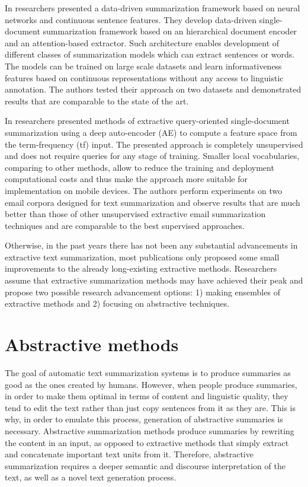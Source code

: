 \documentclass[11pt,a4paper,onecolumn]{article}
\begin{document}
In \cite{cheng2016neural} researchers presented a data-driven summarization framework based on neural networks and continuous sentence features.
They develop data-driven single-document summarization framework based on an hierarchical document encoder and an attention-based extractor.
Such architecture enables development of different classes of summarization models which can extract sentences or words.
The models can be trained on large scale datasets and learn informativeness features based on continuous representations without any access to linguistic annotation.
The authors tested their approach on two datasets and demonstrated results that are
comparable to the state of the art.

In \cite{yousefi2017text} researchers presented methods of extractive query-oriented single-document summarization using a deep auto-encoder (AE) to compute a feature space from the term-frequency (tf) input.
The presented approach is completely unsupervised and does not require queries for any stage of training.
Smaller local vocabularies, comparing to other methods, allow to reduce the training and deployment computational costs and thus make the approach more suitable for implementation on mobile devices.
The authors perform experiments on two email corpora designed for text summarization and observe results that are much better than those of other unsupervised extractive email summarization techniques and are comparable to the best supervised approaches.

Otherwise, in the past years there has not been any substantial advancements in extractive text summarization, most publications only proposed some small improvements to the already long-existing extractive methods.
Researchers \cite{mehta2016extractive} assume that extractive summarization methods may have achieved their peak and propose two possible research advancement options:  1) making ensembles of extractive methods and 2) focusing on abstractive techniques.

\section{Abstractive methods} \label{abstractive}
The goal of automatic text summarization systems is to produce summaries as good as the ones created by humans.
However, when people produce summaries, in order to make them optimal in terms of content and linguistic quality, they tend to edit the text rather than just copy sentences from it as they are.
This is why, in order to emulate this process, generation of abstractive summaries is necessary.
Abstractive summarization methods produce summaries by rewriting the content in an input, as opposed to extractive methods that simply extract and concatenate important text units from it.
Therefore, abstractive summarization requires a deeper semantic and discourse interpretation of the text, as well as a novel text generation process.
\end{document}
